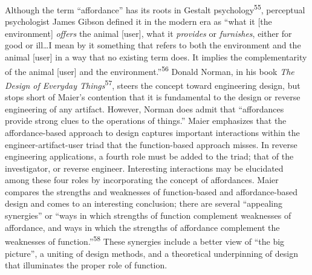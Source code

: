 Although the term “affordance” has its roots in Gestalt
psychology\textsuperscript{55}, perceptual psychologist James Gibson
defined it in the modern era as “what it [the environment]
\textit{offers} the animal [user], what it \textit{provides} or
\textit{furnishes}, either for good or ill…I mean by it something that
refers to both the environment and the animal [user] in a way that no
existing term does. It implies the complementarity of the animal [user]
and the environment.”\textsuperscript{56} Donald Norman, in his book
\textit{The Design of Everyday Things}\textsuperscript{57}, steers the
concept toward engineering design, but stops short of Maier’s
contention that it is fundamental to the design or reverse engineering
of any artifact. However, Norman does admit that “affordances provide
strong clues to the operations of things.” Maier emphasizes that the
affordance-based approach to design captures important interactions
within the engineer-artifact-user triad that the function-based
approach misses. In reverse engineering applications, a fourth role
must be added to the triad; that of the investigator, or reverse
engineer. Interesting interactions may be elucidated among these four
roles by incorporating the concept of affordances. Maier compares the
strengths and weaknesses of function-based and affordance-based design
and comes to an interesting conclusion; there are several “appealing
synergies” or “ways in which strengths of function complement
weaknesses of affordance, and ways in which the strengths of affordance
complement the weaknesses of function.”\textsuperscript{58} These
synergies include a better view of “the big picture”, a uniting of
design methods, and a theoretical underpinning of design that
illuminates the proper role of function.


